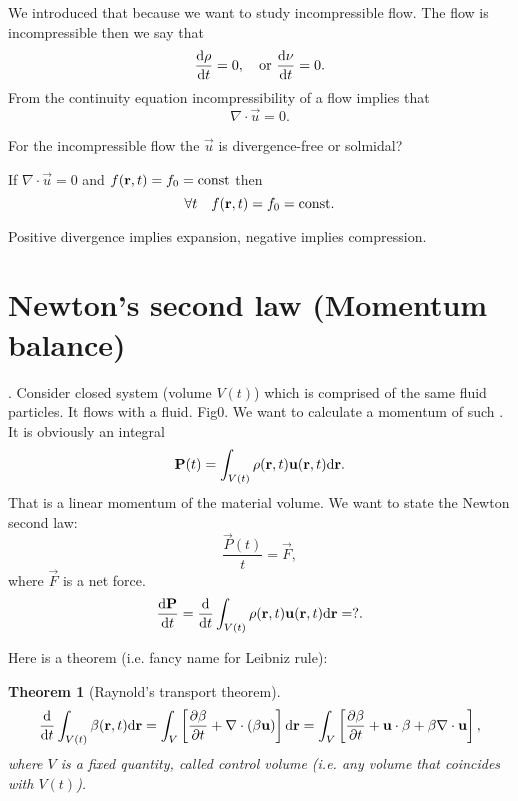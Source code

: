 \documentclass[11pt,oneside]{book}
\theoremstyle{definition} %
\theoremstyle{plain} %
\newtheorem{theorem}{Theorem}[section]
\theoremstyle{remark} %
\theoremstyle{underline}
\begin{document}
  We introduced that because we want to study incompressible flow.
  The flow is incompressible then we say that 
  \begin{displaymath}
    \frac{\mathrm{d} \rho}{\mathrm{d} t} = 0, \quad \textrm{or } \frac{\mathrm{d} \nu}{\mathrm{d} t} = 0.
  \end{displaymath}
  From the continuity equation incompressibility of a flow implies that
  \begin{displaymath}
    \nabla \cdot \vec u = 0.
  \end{displaymath}
  
  For the incompressible flow the $\vec u$ is divergence-free or solmidal? \todo

  If $\nabla \cdot \vec u = 0$ and $ f(\mathbf{r}, t) = f_0 = \textrm{const}$ then
  \begin{displaymath}
    \forall t \quad f(\mathbf{r}, t) = f_0 = \textrm{const}.
  \end{displaymath}

  Positive divergence implies expansion, negative implies compression.
  

  \section{Newton's second law (Momentum balance)}
  . Consider closed system (volume $V(t)$) which is comprised of the same fluid particles.
  It flows with a fluid. \todo Fig0.
  We want to calculate a momentum of such .
  It is obviously an integral
  \begin{displaymath}
    \mathbf{P} (t) = \int_{V(t)} \rho(\mathbf{r}, t) \mathbf{u}(\mathbf{r}, t) \mathrm{d} \mathbf{r}.
  \end{displaymath}
  That is a linear momentum of the material volume.
  We want to state the Newton second law:
  \begin{displaymath}
    \dfrac{\vec P(t)}{t} = \vec F, 
  \end{displaymath}
  where $\vec F$ is a net force.
  \begin{displaymath}
    \frac{\mathrm{d} \mathbf{P}}{\mathrm{d} t} = \frac{\mathrm{d} }{\mathrm{d} t} \int_{V(t)} \rho(\mathbf{r}, t) \mathbf{u} (\mathbf{r}, t) \mathrm{d} \mathbf{r} = ?.
  \end{displaymath}
  
  Here is a theorem (i.e. fancy name for Leibniz rule):
  
  \begin{theorem}[Raynold's transport theorem]
    \begin{displaymath}
      \frac{\mathrm{d} }{\mathrm{d} t} \int_{V(t)} \beta (\mathbf{r}, t) \mathrm{d} \mathbf{r} = 
      \int_{V}\left[ \frac{\partial \beta}{\partial t} + \nabla \cdot (\beta \mathbf{u}) \right] \mathrm{d} \mathbf{r}
      = \int_V \left[ \frac{\partial \beta}{\partial t} + \mathbf{u} \cdot \mathbf{\beta} + \beta \nabla \cdot \mathbf{u} \right]
      ,
    \end{displaymath}
    where $V$ is a fixed quantity, called control volume (i.e. any volume that coincides with $V(t)$).
  \end{theorem}
\end{document}
